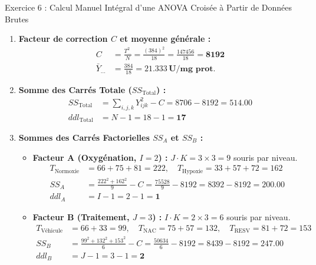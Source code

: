 \documentclass[11pt,a4paper]{article}
\begin{document}
\begin{solutionbox}{Exercice 6 : Calcul Manuel Intégral d'une ANOVA Croisée à Partir de Données Brutes}
\begin{enumerate}[label=\textbf{\alph*.}]
  \item \textbf{Facteur de correction $C$ et moyenne générale :}
  \begin{align*}
    C &= \frac{T_{\dots}^2}{N} = \frac{(384)^2}{18} = \frac{147456}{18} = \mathbf{8192} \\
    \bar{Y}_{\dots} &= \frac{384}{18} = \mathbf{21.333\,\text{U/mg prot.}}
  \end{align*}

  \item \textbf{Somme des Carrés Totale ($SS_{\text{Total}}$) :}
  \begin{align*}
    SS_{\text{Total}} &= \sum_{i,j,k} Y_{ijk}^2 - C = 8706 - 8192 = \mathbf{514.00} \\
    ddl_{\text{Total}} &= N - 1 = 18 - 1 = \mathbf{17}
  \end{align*}

  \item \textbf{Sommes des Carrés Factorielles $SS_A$ et $SS_B$ :}
  \begin{itemize}
    \item \textbf{Facteur A (Oxygénation, $I=2$) :} $J \cdot K = 3 \times 3 = 9$ souris par niveau.
    \begin{align*}
      T_{\text{Normoxie}} &= 66 + 75 + 81 = 222, \quad T_{\text{Hypoxie}} = 33 + 57 + 72 = 162 \\
      SS_A &= \frac{222^2 + 162^2}{9} - C = \frac{75528}{9} - 8192 = 8392 - 8192 = \mathbf{200.00} \\
      ddl_A &= I - 1 = 2 - 1 = \mathbf{1}
    \end{align*}
    \item \textbf{Facteur B (Traitement, $J=3$) :} $I \cdot K = 2 \times 3 = 6$ souris par niveau.
    \begin{align*}
      T_{\text{Véhicule}} &= 66 + 33 = 99, \quad T_{\text{NAC}} = 75 + 57 = 132, \quad T_{\text{RESV}} = 81 + 72 = 153 \\
      SS_B &= \frac{99^2 + 132^2 + 153^2}{6} - C = \frac{50634}{6} - 8192 = 8439 - 8192 = \mathbf{247.00} \\
      ddl_B &= J - 1 = 3 - 1 = \mathbf{2}
    \end{align*}
  \end{itemize}


\end{enumerate}
\end{solutionbox}
\end{document}
